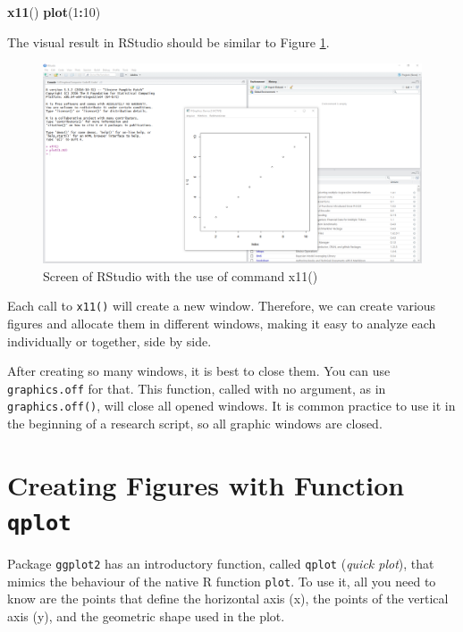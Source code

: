 \documentclass[11pt,]{book}
\newenvironment{Shaded}{\begin{snugshade}}{\end{snugshade}}
\newcommand{\KeywordTok}[1]{\textcolor[rgb]{0.27,0.27,0.27}{\textbf{#1}}}
\newcommand{\DecValTok}[1]{\textcolor[rgb]{0.06,0.06,0.06}{#1}}
\newcommand{\OperatorTok}[1]{\textcolor[rgb]{0.81,0.36,0.00}{\textbf{#1}}}
\newcommand{\NormalTok}[1]{#1}
\begin{document}
\begin{Shaded}
\begin{Highlighting}[]
\KeywordTok{x11}\NormalTok{()}
\KeywordTok{plot}\NormalTok{(}\DecValTok{1}\OperatorTok{:}\DecValTok{10}\NormalTok{)}
\end{Highlighting}
\end{Shaded}

The visual result in RStudio should be similar to Figure
\ref{fig:UseOfX11}.

\begin{figure}[!htbp]

{\centering \includegraphics[width=1\linewidth]{figs/UseOfX11} 

}

\caption{Screen of RStudio with the use of command x11()}\label{fig:UseOfX11}
\end{figure}

Each call to \texttt{x11()} will create a new window. Therefore, we can
create various figures and allocate them in different windows, making it
easy to analyze each individually or together, side by side.

After creating so many windows, it is best to close them. You can use
\texttt{graphics.off} for that. This function, called with no argument,
as in \texttt{graphics.off()}, will close all opened windows. It is
common practice to use it in the beginning of a research script, so all
graphic windows are closed.

\section{\texorpdfstring{Creating Figures with Function
\texttt{qplot}}{Creating Figures with Function qplot}}\label{creating-figures-with-function-qplot}

Package \texttt{ggplot2} has an introductory function, called
\texttt{qplot} (\emph{quick plot}), that mimics the behaviour of the
native R function \texttt{plot}. To use it, all you need to know are the
points that define the horizontal axis (x), the points of the vertical
axis (y), and the geometric shape used in the plot.
\end{document}
